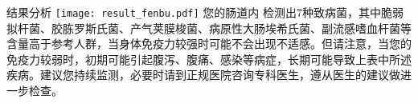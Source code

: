 \vspace*{1mm}
\fontsize{9.3pt}{11pt}\selectfont
\begin{LRaside}[.8]{结果分析}
\noindent
\texttt{[image: result\_fenbu.pdf]}
\asidebreak %
您的肠道内
检测出7种致病菌，其中脆弱拟杆菌、胶胨罗斯氏菌、产气荚膜梭菌、病原性大肠埃希氏菌、副流感嗜血杆菌等含量高于参考人群，当身体免疫力较强时可能不会出现不适感。但请注意，当您的免疫力较弱时，初期可能引起腹泻、腹痛、感染等病症，长期可能导致上表中所述疾病。建议您持续监测，必要时请到正规医院咨询专科医生，遵从医生的建议做进一步检查。

\end{LRaside}


